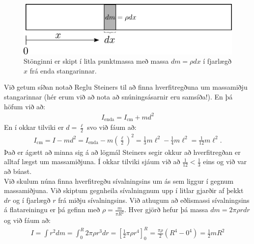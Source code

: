 \begin{figure}[H]
    \centering
    \includegraphics[scale=0.5]{momentsOfInertia/stongendi.pdf}
    \caption{Stönginni er skipt í litla punktmassa með massa $dm = \rho dx$ í fjarlægð $x$ frá enda stangarinnar.}
\end{figure}
Við getum síðan notað Reglu Steiners til að finna hverfitregðuna um massamiðju stangarinnar (hér erum við að nota að snúningsásarnir eru samsíða!). En þá höfum við að:
\begin{align*}
    I_{\text{enda}} = I_{\text{cm}} + md^2
\end{align*}
En í okkar tilviki er $d = \frac{\ell}{2}$ svo við fáum að:
\begin{align*}
    I_{\text{cm}} = I - md^2  = I_{\text{enda}} - m\left( \frac{\ell}{2} \right)^2 = \frac{1}{3}m\ell^2 - \frac{1}{4}m\ell^2 = \frac{1}{12}m\ell^2.
\end{align*}
Það er ágætt að minna sig á að lögmál Steiners segir okkur að hverfitregðan er alltaf lægst um massamiðjuna. Í okkar tilviki sjáum við að $\frac{1}{12} < \frac{1}{3}$ eins og við var að búast. \\

Við skulum núna finna hverfitregðu sívalningsins um ás sem liggur í gegnum massamiðjuna. Við skiptum gegnheila sívalningnum upp í litlar gjarðir af þekkt $dr$ og í fjarlægð $r$ frá miðju sívalningsins. Við athugum að eðlismassi sívalningsins á flatareiningu er þá gefinn með $\rho = \frac{m}{\pi R^2}$. Hver gjörð hefur þá massa $dm = 2\pi \rho r dr$ og við fáum að:
\begin{align*}
    I = \int r^2 dm = \int_{0}^{R} 2\pi \rho r^3 dr = \left[ \frac{1}{2}\pi \rho r^4  \right]_{0}^{R} = \frac{\pi \rho}{2}\left(R^4 - 0^4 \right) = \frac{1}{2}mR^2
\end{align*}

